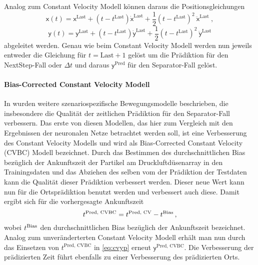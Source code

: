 Analog zum Constant Velocity Modell können daraus die Positionsgleichungen 
% 
\begin{equation*}
    \mathsf{x}(t) = \mathsf{x}^{\text{Last}} + (t - t^{\text{Last}})\dot{\mathsf{x}}^{\text{Last}} 
    + \frac{1}{2} (t - t^{\text{Last}})^2 \: \ddot{\mathsf{x}}^{\text{Last}} \: , 
\end{equation*}
\begin{equation*}
    \mathsf{y}(t) = \mathsf{y}^{\text{Last}} + (t - t^{\text{Last}})\dot{\mathsf{y}}^{\text{Last}}
    + \frac{1}{2} (t - t^{\text{Last}})^2 \: \ddot{\mathsf{y}}^{\text{Last}}
\end{equation*}
% 
abgeleitet werden.
Genau wie beim Constant Velocity Modell werden nun jeweils entweder die Gleichung für \(t = \text{Last} + 1\) gelöst 
um die Prädiktion für den NextStep-Fall oder \(\Delta t \) und daraus \(\mathsf{y}^{\text{Pred}}\) für den Separator-Fall gelöst.


\paragraph{Bias-Corrected Constant Velocity Modell}

In \cite{Pfaff2018} wurden weitere szenariospezifische Bewegungsmodelle beschrieben, die insbesondere die Qualität der zeitlichen Prädiktion für den Separator-Fall verbessern.
Das erste von diesen Modellen, das hier zum Vergleich mit den Ergebnissen der neuronalen Netze betrachtet werden soll, ist eine Verbesserung des Constant Velocity Modells und wird als Bias-Corrected Constant Velocity (CVBC) Modell bezeichnet.
Durch das Bestimmen des durchschnittlichen Bias bezüglich der Ankunftszeit der Partikel am Druckluftdüsenarray in den Trainingsdaten und das Abziehen des selben vom der Prädiktion der Testdaten kann die Qualität dieser Prädiktion verbessert werden.
Dieser neue Wert kann nun für die Ortsprädiktion benutzt werden und verbessert auch diese.
Damit ergibt sich für die vorhergesagte Ankunftszeit
% 
\begin{equation*}
    t{^{\text{Pred, CVBC}}} = t{^{\text{Pred, CV}}} - t{^{\text{Bias}}} \, ,
\end{equation*}
% 
wobei \(t{^{\text{Bias}}}\) den durchschnittlichen Bias bezüglich der Ankunftszeit bezeichnet.
Analog zum unveränderterten Constant Velocity Modell erhält man nun durch das Einsetzen von \(t^{\text{Pred, CVBC}}\) in \eqref{eq:cvyp} erneut \(\mathsf{y}^{\text{Pred, CVBC}}\).
Die Verbesserung der prädizierten Zeit führt ebenfalls zu einer Verbesserung des prädizierten Orts.


